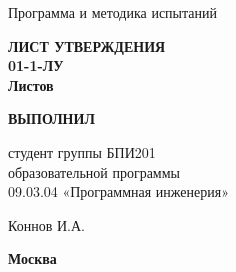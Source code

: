 \vfill

    \textbf{\uppercase{\docTitle}}

    \bigskip

    Программа и методика испытаний

    \bigskip

    \textbf{
    	\Large
    		ЛИСТ УТВЕРЖДЕНИЯ \\
    	\large
    		{\docId} 01-1-ЛУ \\
    	\normalsize
    		Листов \pageref*{LastPage}
    }

\vfill

    \makebox[0.45\textwidth]{}\hfil%
    \begin{minipage}[t]{0.45\textwidth}\centering
    	\textbf{ВЫПОЛНИЛ}
            
    	студент группы БПИ201 \\
    	образовательной программы \\
    	09.03.04 «Программная инженерия» \\
    \end{minipage}

\bigskip

    \makebox[0.45\textwidth]{}\hfil%
    \begin{minipage}[t]{0.45\textwidth}\centering
    	\placename Коннов И.А. \\
    	\placedate
    \end{minipage}

\vskip 1.5cm

    \textbf{Москва \YEAR}